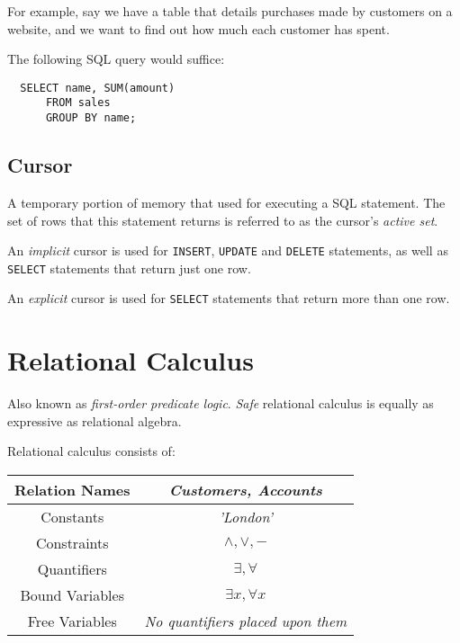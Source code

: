 \documentclass{article}
\begin{document}
For example, say we have a table that details purchases made by customers on a website, and we want to find out how much each customer has spent.

The following SQL query would suffice:

\begin{lstlisting}
  SELECT name, SUM(amount)
      FROM sales
      GROUP BY name;
\end{lstlisting}

\subsection{Cursor}

A temporary portion of memory that used for executing a SQL statement. The set of rows that this statement returns is referred to as the cursor's \textit{active set}.

An \textit{implicit} cursor is used for \texttt{INSERT}, \texttt{UPDATE} and \texttt{DELETE} statements, as well as \texttt{SELECT} statements that return just one row.

An \textit{explicit} cursor is used for \texttt{SELECT} statements that return more than one row.

\section{Relational Calculus}

Also known as \textit{first-order predicate logic}. \textit{Safe} relational calculus is equally as expressive as relational algebra.

Relational calculus consists of:

\begin{center}
  \begin{tabular}{|c|c|}
    \hline
    Relation Names & \textit{Customers, Accounts}\\
    \hline
    Constants & \textit{'London'}\\
    \hline
    Constraints & $\wedge, \vee, -$\\
    \hline
    Quantifiers & $\exists, \forall$\\
    \hline
    Bound Variables & $\exists x, \forall x$\\
    \hline
    Free Variables & \textit{No quantifiers placed upon them}\\
    \hline
  \end{tabular}
\end{center}
\end{document}

